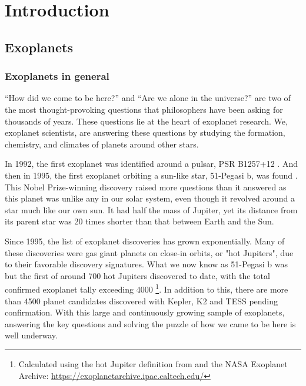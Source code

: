 \chapter{Introduction}
\label{ch:intro}

\graphicspath{{./gfx/fig_intro/}}


\section{Exoplanets}

\subsection{Exoplanets in general}

``How did we come to be here?'' and ``Are we alone in the universe?'' are two of the most thought-provoking questions that philosophers have been asking for thousands of years. These questions lie at the heart of exoplanet research. We, exoplanet scientists, are answering these questions by studying the formation, chemistry, and climates of planets around other stars.

In 1992, the first exoplanet was identified around a pulsar, PSR B1257+12 \citep{Wolszczan1992}. And then in 1995, the first exoplanet orbiting a sun-like star, 51-Pegasi b, was found \citep{Mayor1995}. This Nobel Prize-winning discovery raised more questions than it answered as this planet was  unlike any in our solar system, even though it revolved around  a star much like our own sun. It had half the mass of Jupiter, yet its distance from its parent star was 20 times shorter than that between Earth and the Sun.

Since 1995, the list of exoplanet discoveries has grown exponentially. Many of these discoveries were gas giant planets on close-in orbits, or "hot Jupiters", due to their favorable discovery signatures. What we now know as 51-Pegasi b was but the first of around 700 hot Jupiters discovered to date, with the total confirmed exoplanet tally exceeding 4000 \footnote{Calculated using the hot Jupiter definition from \citet{Winn2010} and the NASA Exoplanet Archive: \href{https://exoplanetarchive.ipac.caltech.edu/}{https://exoplanetarchive.ipac.caltech.edu/}}. In addition to this, there are more than 4500 planet candidates discovered with Kepler, K2 and TESS pending confirmation. With this large and continuously growing sample of exoplanets, answering the key questions and solving the puzzle of how we came to be here is well underway.

